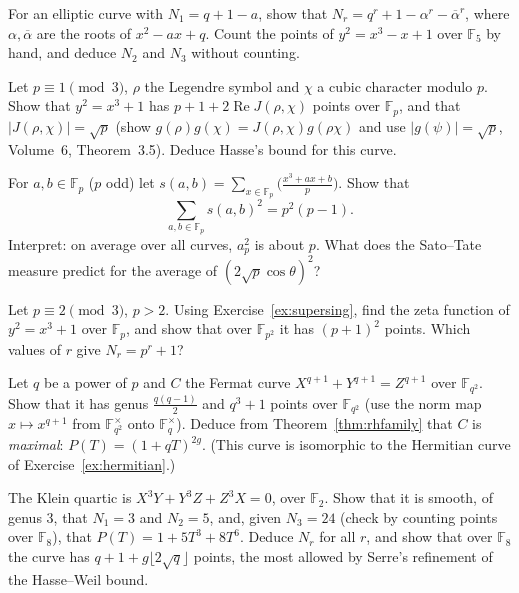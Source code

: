 \begin{exercise}[$\star$]\label{ex:ellNr}
For an elliptic curve with $N_1=q+1-a$, show that $N_r=q^r+1-\alpha^r-\overline\alpha^r$, where $\alpha,\overline\alpha$ are the roots of $x^2-ax+q$. Count the points of
$y^2=x^3-x+1$ over $\mathbb F_5$ by hand, and deduce $N_2$ and $N_3$ without counting.
\end{exercise}

\begin{exercise}[$\star\star$]\label{ex:jacobicount}
Let $p\equiv1\pmod3$, $\rho$ the Legendre symbol and $\chi$ a cubic character modulo $p$. Show that $y^2=x^3+1$ has $p+1+2\operatorname{Re}J(\rho,\chi)$ points over
$\mathbb F_p$, and that $|J(\rho,\chi)|=\sqrt p$ (show $g(\rho)g(\chi)=J(\rho,\chi)g(\rho\chi)$ and use $|g(\psi)|=\sqrt p$, Volume~6, Theorem~3.5). Deduce Hasse's bound for this
curve.
\end{exercise}

\begin{exercise}[$\star\star$]\label{ex:moment}
For $a,b\in\mathbb F_p$ ($p$ odd) let $s(a,b)=\sum_{x\in\mathbb F_p}\bigl(\frac{x^3+ax+b}p\bigr)$. Show that
\[
\sum_{a,b\in\mathbb F_p}s(a,b)^2=p^2(p-1).
\]
Interpret: on average over all curves, $a_p^2$ is about $p$. What does the Sato--Tate measure predict for the average of $(2\sqrt p\cos\theta)^2$?
\end{exercise}

\begin{exercise}[$\star\star$]\label{ex:supersingp2}
Let $p\equiv2\pmod3$, $p>2$. Using Exercise~\ref{ex:supersing}, find the zeta function of $y^2=x^3+1$ over $\mathbb F_p$, and show that over $\mathbb F_{p^2}$ it has
$(p+1)^2$ points. Which values of $r$ give $N_r=p^r+1$?
\end{exercise}

\begin{exercise}[$\star\star$]\label{ex:maximal}
Let $q$ be a power of $p$ and $C$ the Fermat curve $X^{q+1}+Y^{q+1}=Z^{q+1}$ over $\mathbb F_{q^2}$. Show that it has genus $\frac{q(q-1)}2$ and $q^3+1$ points over
$\mathbb F_{q^2}$ (use the norm map $x\mapsto x^{q+1}$ from $\mathbb F_{q^2}^\times$ onto $\mathbb F_q^\times$). Deduce from Theorem~\ref{thm:rhfamily} that $C$ is
\emph{maximal}: $P(T)=(1+qT)^{2g}$. (This curve is isomorphic to the Hermitian curve of Exercise~\ref{ex:hermitian}.)
\end{exercise}

\begin{exercise}[$\star\star\star$]\label{ex:klein}
The Klein quartic is $X^3Y+Y^3Z+Z^3X=0$, over $\mathbb F_2$. Show that it is smooth, of genus $3$, that $N_1=3$ and $N_2=5$, and, given $N_3=24$ (check by counting points over $\mathbb F_8$), that $P(T)=1+5T^3+8T^6$. Deduce $N_r$ for all $r$, and show that over $\mathbb F_8$ the curve has $q+1+g\lfloor2\sqrt q\rfloor$ points, the most allowed by
Serre's refinement of the Hasse--Weil bound.
\end{exercise}

